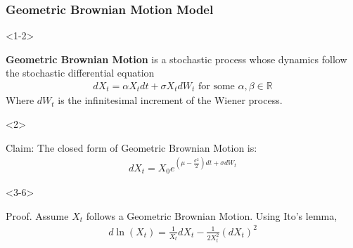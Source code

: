 \documentclass[10pt]{beamer}
\begin{document}
\begin{frame}[t]
  \frametitle{Geometric Brownian Motion Model}
  \begin{onlyenv}<1-2>
    \begin{definition}
      \textbf{Geometric Brownian Motion} is a stochastic process whose dynamics follow the stochastic differential equation 
      \begin{align*}
        dX_t = \alpha X_t dt + \sigma X_t dW_t \text{ for some } \alpha,\beta \in \mathbb{R}
      \end{align*}
      Where $dW_t$ is the infinitesimal increment of the Wiener process.
    \end{definition}
  \end{onlyenv}
  \begin{onlyenv}<2>
    \begin{block}{Claim:}
      The closed form of Geometric Brownian Motion is:
      \begin{align*}
        dX_t = X_0 e^{(\mu - \frac{\sigma^2}{2})dt + \sigma dW_t}
      \end{align*}
    \end{block}
  \end{onlyenv}
  \begin{onlyenv}<3-6>
    \begin{block}{Proof.}
      Assume $X_t$ follows a Geometric Brownian Motion. Using Ito's lemma,
      \begin{align*}
        d\ln(X_t) = \frac{1}{X_t}dX_t - \frac{1}{2X_t^2}(dX_t)^2
      \end{align*}
    \end{block}

\end{onlyenv}
\end{frame}
\end{document}
